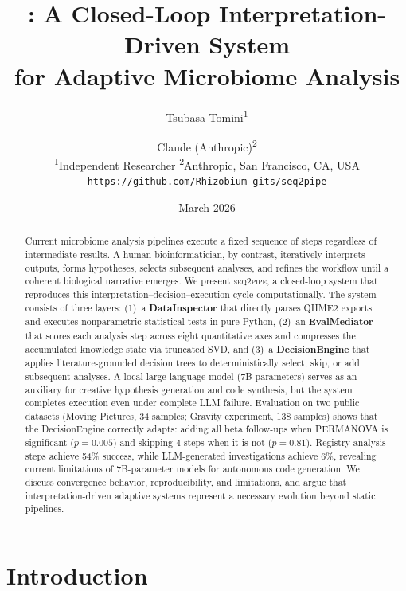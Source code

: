 \documentclass[11pt,a4paper]{article}
\title{
  \seqpipe: A Closed-Loop Interpretation-Driven System\\
  for Adaptive Microbiome Analysis
}
\author{
  Tsubasa Tomini\textsuperscript{1}
  \and
  Claude (Anthropic)\textsuperscript{2}
  \\[4pt]
  \textsuperscript{1}Independent Researcher
  \quad
  \textsuperscript{2}Anthropic, San Francisco, CA, USA
  \\[4pt]
  \texttt{https://github.com/Rhizobium-gits/seq2pipe}
}
\date{March 2026}
\newcommand{\seqpipe}{\textsc{seq2pipe}}
\begin{document}
\maketitle

\begin{abstract}

Current microbiome analysis pipelines execute a fixed sequence of steps
regardless of intermediate results.
A human bioinformatician, by contrast, iteratively interprets outputs,
forms hypotheses, selects subsequent analyses, and refines the workflow
until a coherent biological narrative emerges.
We present \seqpipe, a closed-loop system that reproduces this
interpretation--decision--execution cycle computationally.
The system consists of three layers:
(1)~a \textbf{DataInspector} that directly parses QIIME2 exports and
executes nonparametric statistical tests in pure Python,
(2)~an \textbf{EvalMediator} that scores each analysis step across
eight quantitative axes and compresses the accumulated knowledge state
via truncated SVD, and
(3)~a \textbf{DecisionEngine} that applies literature-grounded decision
trees to deterministically select, skip, or add subsequent analyses.
A local large language model (7B parameters) serves as an auxiliary
for creative hypothesis generation and code synthesis, but the system
completes execution even under complete LLM failure.
Evaluation on two public datasets (Moving Pictures, 34 samples;
Gravity experiment, 138 samples) shows that the DecisionEngine
correctly adapts: adding all beta follow-ups when PERMANOVA is
significant ($p = 0.005$) and skipping 4 steps when it is not
($p = 0.81$).
Registry analysis steps achieve 54\% success, while LLM-generated
investigations achieve 6\%, revealing current limitations of
7B-parameter models for autonomous code generation.
We discuss convergence behavior, reproducibility, and limitations,
and argue that interpretation-driven adaptive systems represent a
necessary evolution beyond static pipelines.

\end{abstract}

\section{Introduction}
\label{sec:intro}
\end{document}
